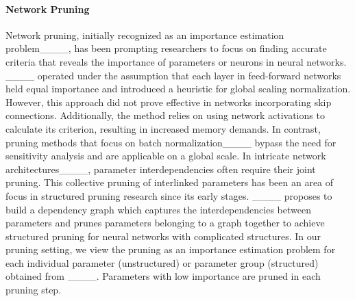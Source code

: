 \paragraph{Network Pruning}
Network pruning, initially recognized as an importance estimation problem____, has been prompting researchers to focus on finding accurate criteria that reveals the importance of parameters or neurons in neural networks. ____ operated under the assumption that each layer in feed-forward networks held equal importance and introduced a heuristic for global scaling normalization. However, this approach did not prove effective in networks incorporating skip connections. Additionally, the method relies on using network activations to calculate its criterion, resulting in increased memory demands. In contrast, pruning methods that focus on batch normalization____ bypass the need for sensitivity analysis and are applicable on a global scale. In intricate network architectures____, parameter interdependencies often require their joint pruning. This collective pruning of interlinked parameters has been an area of focus in structured pruning research since its early stages. ____ proposes to build a dependency graph which captures the interdependencies between parameters and prunes parameters belonging to a graph together to achieve structured pruning for neural networks with complicated structures. In our pruning setting, we view the pruning as an importance estimation problem for each individual parameter (unstructured) or parameter group (structured) obtained from ____. Parameters with low importance are pruned in each pruning step.

